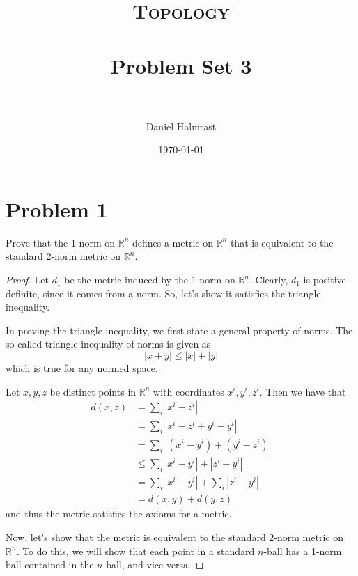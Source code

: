 \documentclass[fontsize=11pt]{scrartcl} %
\title{	
\normalfont \normalsize 
\textsc{Topology} \\ [25pt] %
\horrule{0.5pt} \\[0.4cm] %
\huge Problem Set 3\\ %
\horrule{2pt} \\[0.5cm] %
}
\author{Daniel Halmrast} %
\date{\normalsize\today} %
\numberwithin{equation}{section} %
\numberwithin{figure}{section} %
\numberwithin{table}{section} %
\newcommand{\R}{\mathbb{R}}
\begin{document}
\maketitle %

\section*{Problem 1}
Prove that the 1-norm on $\R^n$ defines a metric on $\R^n$ that is equivalent to the
standard 2-norm metric on $\R^n$.
\\
\begin{proof}
Let $d_1$ be the metric induced by the 1-norm on $\R^n$. Clearly, $d_1$ is positive definite,
since it comes from a norm. So, let's show it satisfies the triangle inequality.

In proving the triangle inequality, we first state a general property of norms. The
so-called triangle inequality of norms is given as
\[
|x+y|\leq |x| + |y|
\]
which is true for any normed space.

Let $x,y,z$ be distinct points in $\R^n$ with coordinates $x^i,y^i,z^i$.
Then we have that
\[
\begin{aligned}
d(x,z)  &= \sum_i |x^i-z^i|\\
        &= \sum_i |x^i-z^i+y^i-y^i|\\
        &= \sum_i |(x^i-y^i) + (y^i-z^i)|\\
        &\leq\sum_i |x^i-y^i| + |z^i-y^i|\\
        &=\sum_i |x^i-y^i| + \sum_i |z^i-y^i|\\
        &= d(x,y) + d(y,z)
\end{aligned}
\]
and thus the metric satisfies the axioms for a metric.

Now, let's show that the metric is equivalent to the standard 2-norm metric on $\R^n$.
To do this, we will show that each point in a standard $n$-ball has a 1-norm ball
contained in the $n$-ball, and vice versa.


\end{proof}
\end{document}

